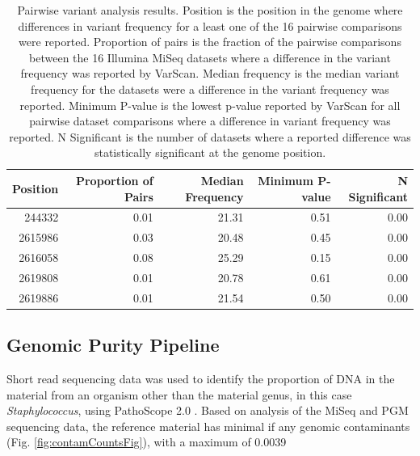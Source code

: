\documentclass[smallextended]{svjour3}\usepackage[]{graphicx}\usepackage[]{color}
\begin{document}
\begin{table}[ht]
\centering
\begin{tabular}{rrrrr}
  \hline
Position & Proportion of Pairs & Median Frequency & Minimum P-value & N Significant \\ 
  \hline
244332 & 0.01 & 21.31 & 0.51 & 0.00 \\ 
  2615986 & 0.03 & 20.48 & 0.45 & 0.00 \\ 
  2616058 & 0.08 & 25.29 & 0.15 & 0.00 \\ 
  2619808 & 0.01 & 20.78 & 0.61 & 0.00 \\ 
  2619886 & 0.01 & 21.54 & 0.50 & 0.00 \\ 
   \hline
\end{tabular}
\caption{Pairwise variant analysis results. Position is the position in the genome where differences in variant frequency for a least one of the 16 pairwise comparisons were reported. Proportion of pairs is the fraction of the pairwise comparisons between the 16 Illumina MiSeq datasets where a difference in the variant frequency was reported by VarScan. Median frequency is the median variant frequency for the datasets were a difference in the variant frequency was reported. Minimum P-value is the lowest p-value reported by VarScan for all pairwise dataset comparisons where a difference in variant frequency was reported. N Significant is the number of datasets where a reported difference was statistically significant at the genome position.} 
\label{Table:homogeneityTable}
\end{table}



\subsection{Genomic Purity Pipeline}
Short read sequencing data was used to identify the proportion of DNA in the material from an organism other than the material genus, in this case \textit{Staphylococcus}, using PathoScope 2.0 \cite{Hong2014} . Based on analysis of the MiSeq and PGM sequencing data, the reference material has minimal if any genomic contaminants (Fig. \ref{fig:contamCountsFig}), with a maximum of 0.0039%
\end{document}
